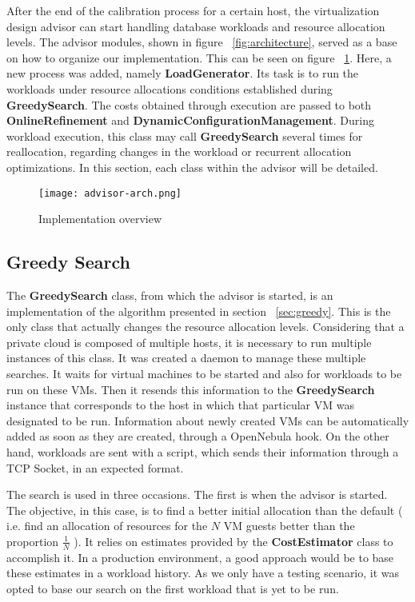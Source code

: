 After the end of the calibration process for a certain host, the virtualization design advisor can start handling database workloads and resource allocation levels. The advisor modules, shown in figure ~\ref{fig:architecture}, served as a base on how to organize our implementation. This can be seen on figure ~\ref{fig:advisor}. Here, a new process was added, namely \textbf{LoadGenerator}.  Its task is to run the workloads under resource allocations conditions established during \textbf{GreedySearch}. The costs obtained through execution are passed to both \textbf{OnlineRefinement} and \textbf{DynamicConfigurationManagement}. During workload execution, this class may call \textbf{GreedySearch} several times for reallocation, regarding changes in the workload or recurrent allocation optimizations. In this section, each class within the advisor will be detailed.


\begin{figure}[ht]
\centering
\texttt{[image: advisor-arch.png]}
\caption{Implementation overview}
\label{fig:advisor}
\end{figure} 

\subsection{Greedy Search}

The \textbf{GreedySearch} class, from which the advisor is started,  is an implementation of the algorithm presented in section ~\ref{sec:greedy}. This is the only class that actually changes the resource allocation levels. Considering that a private cloud is composed of multiple hosts, it is necessary to run multiple instances of this class. It was created a daemon to manage these multiple searches. It waits for virtual machines to be started and also for workloads to be run on these VMs. Then it resends this information to the \textbf{GreedySearch} instance that corresponds to the host in which that particular VM was designated to be run. Information about newly created VMs can be automatically added as soon as they are created, through a OpenNebula hook. On the other hand, workloads are sent with a script, which sends their information through a TCP Socket, in an expected format.

The search is used in three occasions. The first is when the advisor is started. The objective, in this case, is to find a better initial allocation than the default ( i.e. find an allocation of resources for the $N$ VM guests better than the proportion $\frac{1}{N}$ ). It relies on estimates provided by the \textbf{CostEstimator} class to accomplish it. In a production environment, a good approach would be to base these estimates in a workload history. As we only have a testing scenario, it was opted to base our search on the first workload that is yet to be run.

